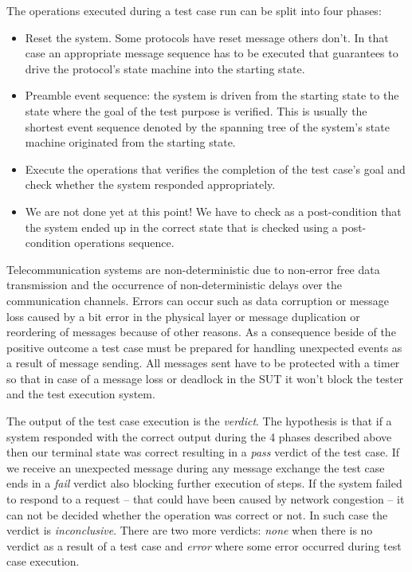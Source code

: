 \documentclass[a4paper]{article}
\begin{document}
The operations executed during a test case run can be split into four phases:
\begin{itemize}
    \item Reset the system. Some protocols have reset message others don't. In that case an appropriate message
          sequence
          has to be executed that guarantees to drive the protocol's state machine into the starting state.
    \item Preamble event sequence: the system is driven from the starting state to the state where the goal of the test
          purpose is verified. This is usually the shortest event sequence denoted by the spanning tree of the system's
          state
          machine originated from the starting state.
    \item Execute the operations that verifies the completion of the test case's goal and check whether the system
          responded appropriately.
    \item We are not done yet at this point! We have to check as a post-condition that the system ended up in the
          correct
          state that is checked using a post-condition operations sequence.
\end{itemize}

Telecommunication systems are non-deterministic due to non-error free data transmission and the occurrence of
non-deterministic delays over the communication channels. Errors can occur such as data corruption or message loss
caused by a bit error in the physical layer or message duplication or reordering of messages because of other reasons.
As a consequence beside of the positive outcome a test case must be prepared for handling unexpected events as a result
of message sending. All messages sent have to be protected with a timer so that in case of a message loss or deadlock
in the SUT it won't block the tester and the test execution system.

The output of the test case execution is the \emph{verdict}. The hypothesis is that if a system responded with the
correct output during the 4 phases described above then our terminal state was correct resulting in a \emph{pass}
verdict of the test case. If we receive an unexpected message during any message exchange the test case ends in a
\emph{fail} verdict also blocking further execution of steps. If the system failed to respond to a request -- that
could have been caused by network congestion -- it can not be decided whether the operation was correct or not. In such
case
the verdict is \emph{inconclusive}. There are two more verdicts: \emph{none} when there is no verdict as a result of a
test case and \emph{error} where some error occurred during test case execution.
\end{document}
